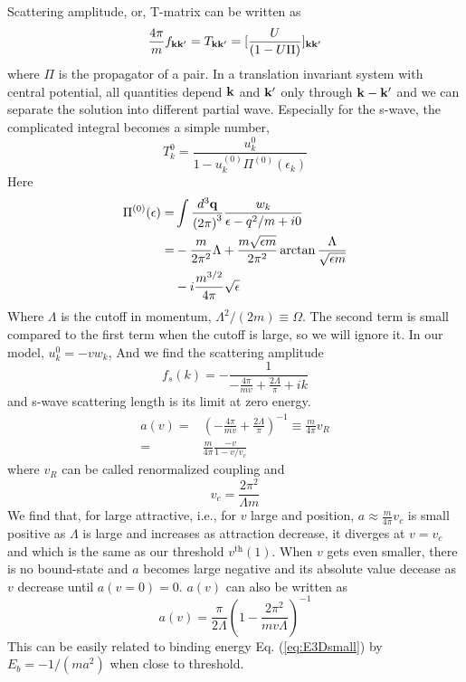 \documentclass[3p,twocolumn]{elsarticle}
\begin{document}
Scattering amplitude, or, T-matrix can be written as 
\begin{equation}
\frac{4\pi}{m}f_{\mathbf{k}\mathbf{k}'}=T_{\mathbf{k}\mathbf{k}'}=[\frac{U}{(1-U\Pi)}]_{\mathbf{k}\mathbf{k}'}
\end{equation}
where $\Pi$ is the propagator of a pair.  In a translation invariant system with central potential, all quantities depend $\mathbf{k}$ and $\mathbf{k}'$ only through $\mathbf{k}-\mathbf{k}'$ and we can separate the solution into different partial wave. Especially for the s-wave, the complicated  integral becomes a simple number,
\begin{equation}
T^{0}_{k}=\frac{u^{0}_{k}}{1-u^{(0)}_{k}\Pi^{(0)}(\epsilon_k)}
\end{equation}
Here 
\begin{equation}
\begin{split}
\Pi^{(0)}(\epsilon)=&\int\frac{d^{3}\mathbf{q}}{{(2\pi)}^{3}}\frac{w_{k}}{\epsilon-q^{2}/m+i0}\\
=&-\frac{m}{2\pi^{2}}{\Lambda}+\frac{m\sqrt{\epsilon{m}}}{2\pi^{2}}\arctan\frac{\Lambda}{\sqrt{\epsilon{m}}}\\
&-i\frac{m^{3/2}}{4\pi}\sqrt{\epsilon}
\end{split}
\end{equation}
Where $\Lambda$ is the cutoff in momentum, $\Lambda^{2}/(2m)\equiv\Omega$. The second term is small compared to the first term when the cutoff is large, so we will ignore it.  In our model, $u^{0}_{k}=-vw_{k}$, And we find the scattering amplitude 
\begin{equation}
f_{s}(k)=-\frac{1}{-\frac{4\pi}{mv}+\frac{2\Lambda}{\pi}+ik}
\end{equation}
and s-wave scattering length is its limit at zero energy. 
\begin{equation}
\begin{split}
a(v)=&\left(-\frac{4\pi}{mv}+\frac{2\Lambda}{\pi}\right)^{-1}\equiv\frac{m}{4\pi}v_{R}\\
     =&\frac{m}{4\pi}\frac{-v}{1-v/v_{c}}
     \end{split}
\end{equation}
where $v_{R}$ can be called renormalized coupling and 
\begin{equation}
v_{c}=\frac{2\pi^{2}}{\Lambda{m}}
\end{equation}
We find that, for large attractive, i.e., for $v$ large and position, $a\approx\frac{m}{4\pi}v_c$ is small positive as $\Lambda$ is large and increases as attraction decrease, it diverges at $v=v_{c}$ and which is the same as our threshold $v^{\text{th}}(1)$.  When $v$ gets even smaller, there is no bound-state and $a$ becomes large negative and its absolute value decease as $v$ decrease until $a(v=0)=0$. 
$a(v)$ can also be written as
\begin{equation}
a(v)=\frac{\pi}{2\Lambda}\left(1-\frac{2\pi^{2}}{mv\Lambda}\right)^{-1}
\end{equation}
This can be easily related to binding energy Eq. (\ref{eq:E3Dsmall}) by $E_{b}=-1/(ma^{2})$ when close to threshold. 
%
%
%


\end{document}

